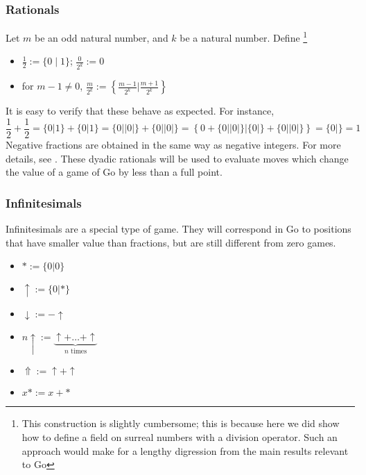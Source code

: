 \documentclass[../math194_paper.tex]{subfiles}
\begin{document}
\subsubsection{Rationals}

\begin{definition} Let $m$ be an odd natural number, and $k$ be a natural 
number. Define \footnote{This construction is slightly cumbersome; this is because 
here we did show how to define a field on surreal numbers with a division operator.
Such an approach would make for a lengthy digression from the main results relevant 
to Go}
\begin{itemize}
    \item $\frac{1}{2} := \{0 \mid 1\}$; \quad  $\frac{0}{2^k} := 0$ 
    \item for $m-1 \neq 0$, $\frac{m}{2^k} := \left\{ \frac{m-1}{2^k} \Bigg| \frac{m+1}{2^k} \right\}$
\end{itemize}
\end{definition}

It is easy to verify that these behave as expected. For instance, 
\[
    \frac{1}{2} + \frac{1}{2} = \{0|1\} + \{0|1\} = \{0||0|\} + \{0||0|\} = 
    \left\{ 0 + \{0||0|\} |  \{0|\} + \{0||0|\} \right\} = \{0|\} = 1
\]
Negative fractions are obtained in the same way as negative integers.
For more details, see \cite[\S 0, \S 1]{conway2000numbers}.
These dyadic rationals will be used to evaluate moves which change the value of a game of Go by less than 
a full point.

\subsubsection{Infinitesimals} \label{infinitesimals}

Infinitesimals are a special type of game. They will correspond in Go to positions 
that have smaller value than fractions, but are still different from zero games.  
\begin{definition}
\begin{itemize} \label{basic_infinitesimals} \:
    \item $* := \{0 | 0 \}$
    \item $\uparrow := \{0 | * \}$
    \item $\downarrow := - \uparrow$
\end{itemize}

\begin{definition} \label{derived_infinitesimals} \:
\begin{itemize}
    \item $n \uparrow := \underbrace{\uparrow + \ldots + \uparrow}_{n \text{ times}}$
    \item $\Uparrow := \uparrow + \uparrow$
    \item $x* := x + *$
\end{itemize}
\end{definition}
\end{definition}
\end{document}
